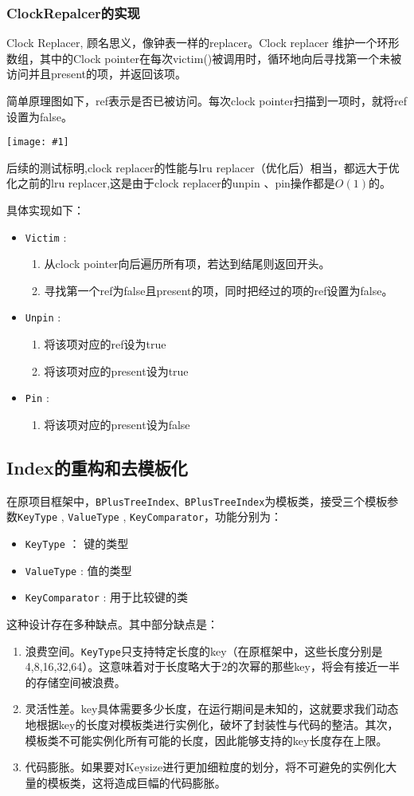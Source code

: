 \documentclass[12pt, a4paper]{article}
\def\c#1{\texttt{#1}}
\def\ss#1{\subsection{#1}}
\def\sss#1{\subsubsection{#1}}
\def\p{\par}
\def\g#1{\begin{center}\texttt{[image: \#1]}\end{center}}
\begin{document}
\sss{ClockRepalcer的实现}
\p Clock Replacer, 顾名思义，像钟表一样的replacer。Clock replacer 维护一个环形数组，其中的Clock pointer在每次victim()被调用时，循环地向后寻找第一个未被访问并且present的项，并返回该项。
\p 简单原理图如下，ref表示是否已被访问。每次clock pointer扫描到一项时，就将ref设置为false。
\g{clock_replacer.pdf}
\p 后续的测试标明,clock replacer的性能与lru replacer（优化后）相当，都远大于优化之前的lru replacer,这是由于clock replacer的unpin 、pin操作都是$O(1)$的。
\p 具体实现如下：
\begin{itemize}
  \item \c{Victim} : \begin{enumerate}
    \item 从clock pointer向后遍历所有项，若达到结尾则返回开头。
    \item 寻找第一个ref为false且present的项，同时把经过的项的ref设置为false。
  \end{enumerate}
  \item \c{Unpin} : \begin{enumerate}
    \item 将该项对应的ref设为true
    \item 将该项对应的present设为true
  \end{enumerate}
  \item \c{Pin} :\begin{enumerate}
    \item 将该项对应的present设为false
  \end{enumerate}
\end{itemize}
\ss{Index的重构和去模板化}
\p 在原项目框架中，\c{BPlusTreeIndex、BPlusTreeIndex}为模板类，接受三个模板参数\c{KeyType} , \c{ValueType} , \c{KeyComparator}，功能分别为：
\begin{itemize}
  \item \c{KeyType} ： 键的类型
  \item \c{ValueType} : 值的类型
  \item \c{KeyComparator} : 用于比较键的类
\end{itemize}
\p 这种设计存在多种缺点。其中部分缺点是：
\begin{enumerate}
  \item 浪费空间。\c{KeyType}只支持特定长度的key（在原框架中，这些长度分别是4,8,16,32,64）。这意味着对于长度略大于2的次幂的那些key，将会有接近一半的存储空间被浪费。
  \item 灵活性差。key具体需要多少长度，在运行期间是未知的，这就要求我们动态地根据key的长度对模板类进行实例化，破坏了封装性与代码的整洁。其次，模板类不可能实例化所有可能的长度，因此能够支持的key长度存在上限。
  \item 代码膨胀。如果要对Keysize进行更加细粒度的划分，将不可避免的实例化大量的模板类，这将造成巨幅的代码膨胀。
\end{enumerate}
\end{document}
